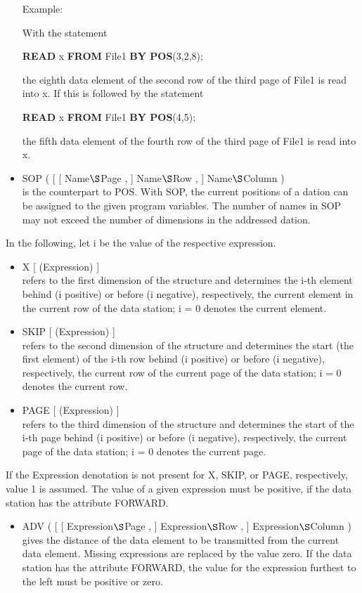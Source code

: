 \begin{itemize}
Example:

With the statement

{\bf READ} x {\bf FROM} File1 {\bf BY POS}(3,2,8);

the eighth data element of the second row of the third page of File1 is
read into x. If this is followed by the statement

{\bf READ} x {\bf FROM} File1 {\bf BY POS}(4,5);

the fifth data element of the fourth row of the third page of File1 is
read into x.
\item SOP ( [ [ Name$\S $Page , ] Name$\S $Row , ] Name$\S $Column )\\
is the counterpart to POS. With SOP, the current positions of a dation
can be assigned to the given program variables. The number of names in
SOP may not exceed the number of dimensions in the addressed dation.
\end{itemize}

In the following, let i be the value of the respective expression.
\begin{itemize}
\item X [ (Expression) ]\\
refers to the first dimension of the structure and determines the i-th
element behind (i positive) or before (i negative), respectively, the
current element in the current row of the data station; i = 0 denotes
the current element.
\item SKIP [ (Expression) ]\\
refers to the second dimension of the structure and determines the start
(the first element) of the i-th row behind (i positive) or before (i
negative), respectively, the current row of the current page of the data
station; i = 0 denotes the current row.
\item PAGE [ (Expression) ]\\
refers to the third dimension of the structure and determines the start
of the i-th page behind (i positive) or before (i negative),
respectively, the current page of the data station; i = 0 denotes the
current page.
\end{itemize}

If the Expression denotation is not present for X, SKIP, or PAGE, respectively,
value 1 is assumed. The value of a given expression must be positive, if
the data station has the attribute FORWARD.
\begin{itemize}
\item ADV ( [ [ Expression$\S $Page , ] Expression$\S $Row , ] Expression$\S $Column )\\
gives the distance of the data element to be transmitted from the
current data element. Missing expressions are replaced by the value
zero. If the data station has the attribute FORWARD, the value for the
expression furthest to the left must be positive or zero.
\end{itemize}

